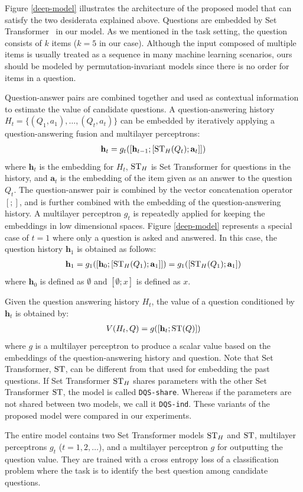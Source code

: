 Figure \ref{deep-model} illustrates the architecture of the proposed model
that can satisfy the two desiderata explained above. 
Questions are embedded by Set Transformer~\cite{lee2019set} in our model.
As we mentioned in the task setting, the question consists of $k$ items ($k=5$ in our case).
Although the input composed of multiple items is usually treated as a sequence in many machine learning scenarios, 
ours should be modeled by permutation-invariant models
since there is no order for items in a question.

Question-answer pairs are combined together and 
used as contextual information to estimate the value of candidate questions. 
A question-answering history $H_{t} = \{(Q_1, a_1), \ldots, (Q_t, a_t)\}$ can be embedded by iteratively applying a question-answering fusion and multilayer perceptrons:
\begin{eqnarray}
{\mathbf h}_t = g_t ([{\mathbf h}_{t-1}; [{\rm ST}_H(Q_{t}); {\mathbf a}_{t}]])
\end{eqnarray}
where ${\mathbf h}_t$ is the embedding for $H_t$,
${\rm ST}_H$ is Set Transformer for questions in the history,
and ${\mathbf a}_t$ is the embedding of the item given as an answer to the question $Q_t$.
The question-answer pair is combined by the vector concatenation operator $[;]$, and is further combined with the embedding of the question-answering history. 
A multilayer perceptron $g_t$ is repeatedly applied for keeping the embeddings in low dimensional spaces.
Figure \ref{deep-model} represents a special case of $t=1$ where only a question is asked and answered.
In this case, the question history ${\mathbf h}_1$ is obtained as follows:
\begin{eqnarray}
{\mathbf h}_1 = g_1 ([{\mathbf h}_{0}; [{\rm ST}_H(Q_{1}); {\mathbf a}_{1}]]) = g_1 ([{\rm ST}_H(Q_{1}); {\mathbf a}_{1}])
\end{eqnarray}
where ${\mathbf h}_0$ is defined as $\emptyset$
and $[\emptyset; x]$ is defined as $x$.

Given the question answering history $H_{t}$,
the value of a question conditioned by ${\mathbf h}_{t}$ is obtained by:
\begin{eqnarray}
V(H_{t}, Q) = g([{\mathbf h}_t; {\rm ST}(Q)])
\end{eqnarray}
where 
$g$ is a multilayer perceptron to produce a scalar value based on the embeddings of the question-answering history and question.
Note that Set Transformer, ${\rm ST}$, 
can be different from that used for embedding the past questions.
If Set Transformer ${\rm ST}_H$ shares parameters with the other Set Transformer ${\rm ST}$, 
the model is called \texttt{DQS-share}. 
Whereas if the parameters are not shared between two models, we call it \texttt{DQS-ind}.
These variants of the proposed model were compared in our experiments. 

The entire model contains two Set Transformer models ${\rm ST}_H$ and ${\rm ST}$,
multilayer perceptrons $g_t$ ($t=1, 2, \ldots$),
and a multilayer perceptron $g$ for outputting the question value.
They are trained with a cross entropy loss
of a classification problem where the task is to identify the best question among candidate questions.